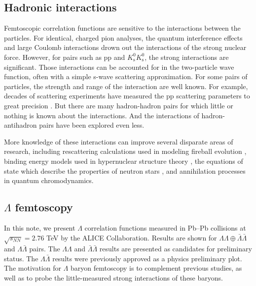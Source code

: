 \subsection{Hadronic interactions}



Femtoscopic correlation functions are sensitive to the interactions between the particles.
For identical, charged pion analyses, the quantum interference effects and large Coulomb interactions drown out the interactions of the strong nuclear force.
However, for pairs such as pp and $K^0_\mathrm{s}K^0_\mathrm{s}$, the strong interactions are significant.
Those interactions can be accounted for in the two-particle wave function, often with a simple s-wave scattering approximation.
For some pairs of particles, the strength and range of the interaction are well known. For example, decades of scattering experiments have measured the pp scattering parameters to great precision \cite{...}.
But there are many hadron-hadron pairs for which little or nothing is known about the interactions.
And the interactions of hadron-antihadron pairs have been explored even less.

More knowledge of these interactions can improve several disparate areas of research, including rescattering calculations used in modeling fireball evolution \cite{Bleicher:1999xi}, binding energy models used in hypernuclear structure theory \cite{Hiyama:2002yj,Filikhin:2002wm}, the equations of state which describe the properties of neutron stars \cite{SchaffnerBielich:2008kb,Wang:2010gr}, and annihilation processes in quantum chromodynamics.


\subsection{$\Lambda$ femtoscopy}




In this note, we present $\Lambda$ correlation functions measured in Pb--Pb collisions at $\sqrt{s_{NN}}=2.76$ TeV by the ALICE Collaboration.  
Results are shown for $\Lambda\Lambda\oplus\bar{\Lambda}\bar{\Lambda}$ and $\Lambda\bar{\Lambda}$ pairs. 
The $\Lambda\Lambda$ and $\bar{\Lambda}\bar{\Lambda}$ results are presented as candidates for preliminary status. 
The $\Lambda\bar{\Lambda}$ results were previously approved as a physics preliminary plot.  
The motivation for $\Lambda$ baryon femtoscopy is to complement previous studies, as well as to probe the little-measured strong interactions of these baryons.

